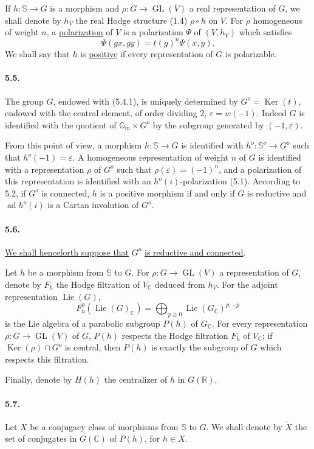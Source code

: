 \documentclass[10pt,leqno]{article}
\newcommand{\C}{\mathbb C}
\newcommand{\R}{\mathbb R}
\newcommand{\bS}{\mathbb S}
\newcommand{\Ker}{\operatorname{Ker}}
\theoremstyle{deligne}
\newcommand{\Lie}{\operatorname{Lie}}
\newcommand{\ad}{\operatorname{ad}}
\newcommand{\GL}{\operatorname{GL}}
\renewcommand{\underline}[1]{\uline{#1}}
\begin{document}
If $h:\bS\to G$ is a morphism and $\rho:G\to\GL(V)$ a real representation of $G$, we shall denote by $h_V$ the real Hodge structure (1.4) $\rho\circ h$ on $V$. For $\rho$ homogeneous of weight $n$, a \underline{polarization} of $V$ is a polarization $\Psi$ of $(V,h_V)$ which satisfies
\[
\tag{5.4.2}
  \Psi(gx,gy)=t(g)^n\Psi(x,y).
\]
We shall say that $h$ is \underline{positive} if every representation of $G$ is polarizable.

\paragraph{5.5.}
The group $G$, endowed with (5.4.1), is uniquely determined by $G^o=\Ker(t)$, endowed with the central element, of order dividing $2$, $\varepsilon=w(-1)$. Indeed $G$ is identified with the quotient of $\mathbb G_m\times G^o$ by the subgroup generated by $(-1,\varepsilon)$.

From this point of view, a morphism $h:\bS\to G$ is identified with $h^o:\bS^o\to G^o$ such that $h^o(-1)=\varepsilon$. A homogeneous representation of weight $n$ of $G$ is identified with a representation $\rho$ of $G^o$ such that $\rho(\varepsilon)=(-1)^n$, and a polarization of this representation is identified with an $h^o(i)$-polarization (5.1). According to 5.2, if $G^o$ is connected, $h$ is a positive morphism if and only if $G$ is reductive and $\ad h^o(i)$ is a Cartan involution of $G^o$.

\paragraph{5.6.}
\underline{We shall henceforth suppose that} $G^o$ \underline{is reductive and connected}.

Let $h$ be a morphism from $\bS$ to $G$. For $\rho:G\to\GL(V)$ a representation of $G$, denote by $F_h$ the Hodge filtration of $V_\C$ deduced from $h_V$. For the adjoint representation $\Lie(G)$,
\[
\tag{5.6.1}
  F_h^0(\Lie(G)_\C)=\bigoplus_{p\ge0}\Lie(G_\C)^{p,-p}
\]
is the Lie algebra of a parabolic subgroup $P(h)$ of $G_\C$. For every representation $\rho:G\to\GL(V)$ of $G$, $P(h)$ respects the Hodge filtration $F_h$ of $V_\C$; if $\Ker(\rho)\cap G^o$ is central, then $P(h)$ is exactly the subgroup of $G$ which respects this filtration.

Finally, denote by $H(h)$ the centralizer of $h$ in $G(\R)$.

\paragraph{5.7.}
Let $X$ be a conjugacy class of morphisms from $\bS$ to $G$. We shall denote by $\check X$ the set of conjugates in $G(\C)$ of $P(h)$, for $h\in X$.
\end{document}
